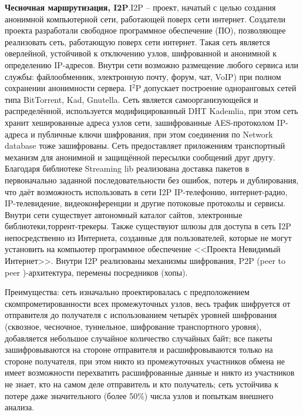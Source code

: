 \textbf{Чесночная маршрутизация, I2P}.I2P --  проект, начатый с целью создания анонимной компьютерной сети, работающей поверх сети интернет. Создатели проекта разработали свободное программное обеспечение (ПО), позволяющее реализовать сеть, работающую поверх сети интернет. Такая сеть является оверлейной, устойчивой к отключению узлов, шифрованной и анонимной к определению IP-адресов. Внутри сети возможно размещение любого сервиса или службы: файлообменник, электронную почту, форум, чат, VoIP) при полном сохранении анонимности сервера. I$ ^{2} $P допускает построение одноранговых сетей типа BitTorrent, Kad, Gnutella. %
Сеть является самоорганизующейся и распределённой, используется модифицированный DHT Kademlia, при этом сеть хранит хешированные адреса узлов сети, зашифрованные AES-протоколом IP-адреса и публичные ключи шифрования, при этом соединения по Network database тоже зашифрованы.	Сеть предоставляет приложениям транспортный механизм для анонимной и защищённой пересылки сообщений друг другу. %
Благодаря библиотеке Streaming lib реализована  доставка пакетов  в первоначально заданной последовательности без ошибок, потерь и дублирования, что даёт возможность использовать в сети I2P IP-телефонию, интернет-радио, IP-телевидение, видеоконференции и другие потоковые протоколы и сервисы. %
Внутри сети  существует автономный каталог сайтов, электронные библиотеки,торрент-трекеры. Также существуют шлюзы для доступа в сеть I2P непосредственно из Интернета, созданные  для пользователей, которые  не могут установить на компьютер программное обеспечение <<Проекта Невидимый Интернет>>. Внутри I2P реализованы механизмы шифрования, P2P (peer to peer )-архитектура, перемены посредников (хопы).

Преимущества: сеть изначально проектировалась с предположением скомпрометированности  всех промежуточных узлов, %
весь трафик шифруется от отправителя до получателя с использованием четырёх уровней шифрования (сквозное, чесночное, туннельное,  шифрование транспортного уровня), добавляется небольшое случайное количество случайных байт; все пакеты зашифровываются на стороне отправителя и расшифровываются только на стороне получателя, при этом никто из промежуточных участников обмена не имеет возможности перехватить расшифрованные данные и никто из участников не знает, кто на самом деле отправитель и кто получатель; сеть устойчива к потере даже значительного (более 50\%) числа узлов и попыткам внешнего анализа.

